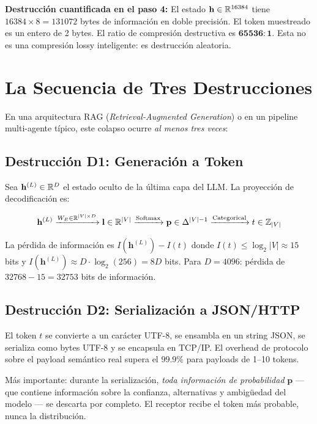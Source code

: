 \begin{criticalbox}
\textbf{Destrucción cuantificada en el paso 4:}
El estado $\mathbf{h} \in \mathbb{R}^{16384}$ tiene $16384 \times 8 = 131072$ bytes
de información en doble precisión. El token muestreado es un entero de 2 bytes.
El ratio de compresión destructiva es $\mathbf{65536:1}$.
Esta no es una compresión lossy inteligente: es destrucción aleatoria.
\end{criticalbox}

\section{La Secuencia de Tres Destrucciones}

En una arquitectura RAG (\textit{Retrieval-Augmented Generation}) o en un
pipeline multi-agente típico, este colapso ocurre \textit{al menos tres veces}:

\subsection{Destrucción D1: Generación a Token}

Sea $\mathbf{h}^{(L)} \in \mathbb{R}^D$ el estado oculto de la última capa del LLM.
La proyección de decodificación es:

\begin{equation}
\mathbf{h}^{(L)} \xrightarrow{W_E \in \mathbb{R}^{|V| \times D}} \mathbf{l} \in \mathbb{R}^{|V|}
\xrightarrow{\text{Softmax}} \mathbf{p} \in \Delta^{|V|-1}
\xrightarrow{\text{Categorical}} t \in \mathbb{Z}_{|V|}
\label{eq:destruccion_d1}
\end{equation}

La pérdida de información es $I(\mathbf{h}^{(L)}) - I(t)$ donde
$I(t) \le \log_2 |V| \approx 15$ bits y $I(\mathbf{h}^{(L)}) \approx D \cdot \log_2(256) = 8D$ bits.
Para $D = 4096$: pérdida de $32768 - 15 = 32753$ bits de información.

\subsection{Destrucción D2: Serialización a JSON/HTTP}

El token $t$ se convierte a un carácter UTF-8, se ensambla en un string JSON,
se serializa como bytes UTF-8 y se encapsula en TCP/IP. El overhead de protocolo
sobre el payload semántico real supera el $99.9\%$ para payloads de 1--10 tokens.

Más importante: durante la serialización, \textit{toda información de probabilidad}
$\mathbf{p}$ --- que contiene información sobre la confianza, alternativas y
ambigüedad del modelo --- se descarta por completo. El receptor recibe el token
más probable, nunca la distribución.

